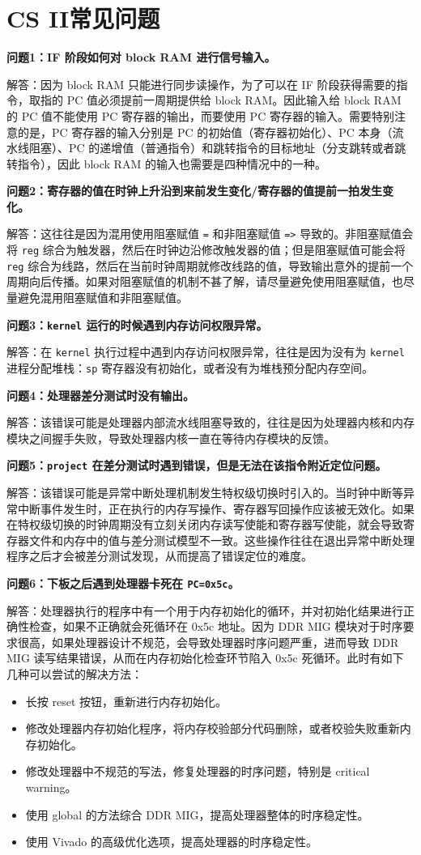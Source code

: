\chapter{CS II常见问题}

\textbf{问题1：IF 阶段如何对 block RAM 进行信号输入。}

解答：因为 block RAM 只能进行同步读操作，为了可以在 IF 阶段获得需要的指令，取指的 PC 值必须提前一周期提供给 block RAM。因此输入给 block RAM 的 PC 值不能使用 PC 寄存器的输出，而要使用 PC 寄存器的输入。需要特别注意的是，PC 寄存器的输入分别是 PC 的初始值（寄存器初始化）、PC 本身（流水线阻塞）、PC 的递增值（普通指令）和跳转指令的目标地址（分支跳转或者跳转指令），因此 block RAM 的输入也需要是四种情况中的一种。

\textbf{问题2：寄存器的值在时钟上升沿到来前发生变化/寄存器的值提前一拍发生变化。}

解答：这往往是因为混用使用阻塞赋值 \texttt{=} 和非阻塞赋值 \texttt{=>} 导致的。非阻塞赋值会将 \texttt{reg} 综合为触发器，然后在时钟边沿修改触发器的值；但是阻塞赋值可能会将 \texttt{reg} 综合为线路，然后在当前时钟周期就修改线路的值，导致输出意外的提前一个周期向后传播。如果对阻塞赋值的机制不甚了解，请尽量避免使用阻塞赋值，也尽量避免混用阻塞赋值和非阻塞赋值。

\textbf{问题3：\texttt{kernel} 运行的时候遇到内存访问权限异常。}

解答：在 \texttt{kernel} 执行过程中遇到内存访问权限异常，往往是因为没有为 \texttt{kernel} 进程分配堆栈：\texttt{sp} 寄存器没有初始化，或者没有为堆栈预分配内存空间。

\textbf{问题4：处理器差分测试时没有输出。}

解答：该错误可能是处理器内部流水线阻塞导致的，往往是因为处理器内核和内存模块之间握手失败，导致处理器内核一直在等待内存模块的反馈。

\textbf{问题5：\texttt{project} 在差分测试时遇到错误，但是无法在该指令附近定位问题。}

解答：该错误可能是异常中断处理机制发生特权级切换时引入的。当时钟中断等异常中断事件发生时，正在执行的内存写操作、寄存器写回操作应该被无效化。如果在特权级切换的时钟周期没有立刻关闭内存读写使能和寄存器写使能，就会导致寄存器文件和内存中的值与差分测试模型不一致。这些操作往往在退出异常中断处理程序之后才会被差分测试发现，从而提高了错误定位的难度。

\textbf{问题6：下板之后遇到处理器卡死在 \texttt{PC=0x5c}。}

解答：处理器执行的程序中有一个用于内存初始化的循环，并对初始化结果进行正确性检查，如果不正确就会死循环在 0x5c 地址。因为 DDR MIG 模块对于时序要求很高，如果处理器设计不规范，会导致处理器时序问题严重，进而导致 DDR MIG 读写结果错误，从而在内存初始化检查环节陷入 0x5c 死循环。此时有如下几种可以尝试的解决方法：

\begin{itemize}
    \item 长按 reset 按钮，重新进行内存初始化。
    \item 修改处理器内存初始化程序，将内存校验部分代码删除，或者校验失败重新内存初始化。
    \item 修改处理器中不规范的写法，修复处理器的时序问题，特别是 critical warning。
    \item 使用 global 的方法综合 DDR MIG，提高处理器整体的时序稳定性。
    \item 使用 Vivado 的高级优化选项，提高处理器的时序稳定性。
\end{itemize}
